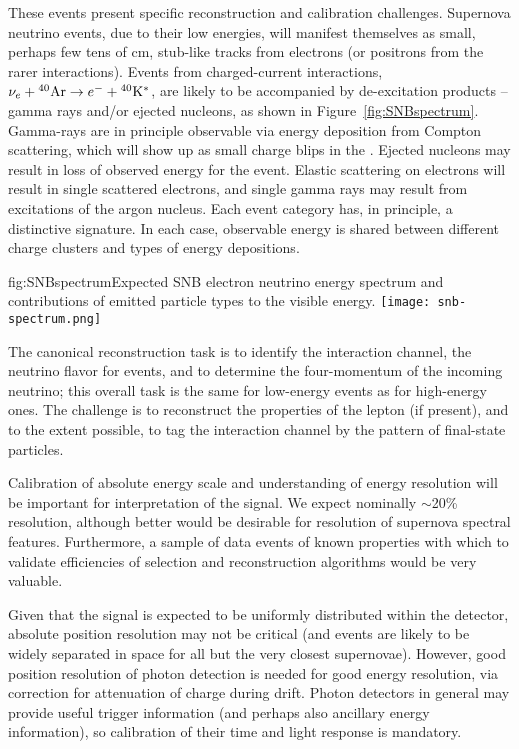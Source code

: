 These events present specific reconstruction and calibration challenges. Supernova neutrino events, due to their low energies, will manifest themselves as small, perhaps few tens of \si{\cm}, stub-like tracks from electrons (or positrons from the rarer \anue interactions). Events from \nue charged-current interactions, $\nu_e+{}^{40}{\rm Ar}\rightarrow e^{-}+{}^{40}{\rm K}^{*}$, are likely to be accompanied by de-excitation products -- gamma rays and/or ejected nucleons, as shown in Figure~\ref{fig:SNBspectrum}. Gamma-rays are in principle observable via energy deposition from Compton scattering, which will show up as small charge blips in the . Ejected nucleons may result in loss of observed energy for the event. Elastic scattering on electrons will result in single
scattered electrons, and single gamma rays may result from  excitations of the argon nucleus.  Each event category has, in principle, a distinctive signature. In each case, observable energy is shared between different charge clusters and types of energy depositions.  

\begin{dunefigure}[]{fig:SNBspectrum}{Expected SNB electron neutrino energy spectrum and contributions of emitted particle types to the visible energy.}
\texttt{[image: snb-spectrum.png]}
\end{dunefigure}

The canonical reconstruction task is to identify the interaction channel, the neutrino flavor for  events, and to determine the four-momentum of the incoming neutrino; this overall task is the same for low-energy events as for high-energy ones.  The challenge is to reconstruct the properties of the lepton (if present), and to the extent possible, to tag the interaction channel by the pattern of final-state particles.

Calibration of absolute energy scale and understanding of energy resolution will be important for interpretation of the signal. We expect nominally $\sim$\num{20}\% resolution, although better would be desirable for resolution of supernova spectral features. Furthermore, a sample of data events of known properties with which to validate efficiencies of selection and reconstruction algorithms would be very valuable.

Given that the signal is expected to be uniformly distributed within the detector, absolute position resolution may not be critical (and events are likely to be widely separated in space for all but the very closest supernovae). However, good position resolution of photon detection is needed for good energy resolution, via correction for attenuation of charge during drift. Photon detectors in general may provide useful trigger information (and perhaps also ancillary energy information), so calibration of their time and light response is mandatory.

